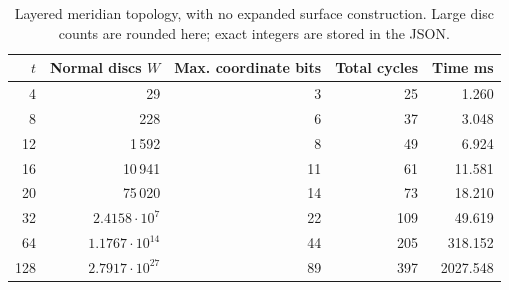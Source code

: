 \begin{table}[htbp]
\centering\small
\setlength{\tabcolsep}{4pt}
\begin{tabular}{@{}rrrrr@{}}
\toprule
$t$ & Normal discs $W$ & Max. coordinate bits & Total cycles & Time ms\\\midrule
4 & 29 & 3 & 25 & 1.260\\
8 & 228 & 6 & 37 & 3.048\\
12 & 1\,592 & 8 & 49 & 6.924\\
16 & 10\,941 & 11 & 61 & 11.581\\
20 & 75\,020 & 14 & 73 & 18.210\\
32 & $2.4158\cdot10^{7}$ & 22 & 109 & 49.619\\
64 & $1.1767\cdot10^{14}$ & 44 & 205 & 318.152\\
128 & $2.7917\cdot10^{27}$ & 89 & 397 & 2027.548\\
\bottomrule
\end{tabular}
\caption{Layered meridian topology, with no expanded surface construction. Large disc counts are rounded here; exact integers are stored in the JSON.}
\label{tab:normal}
\end{table}
